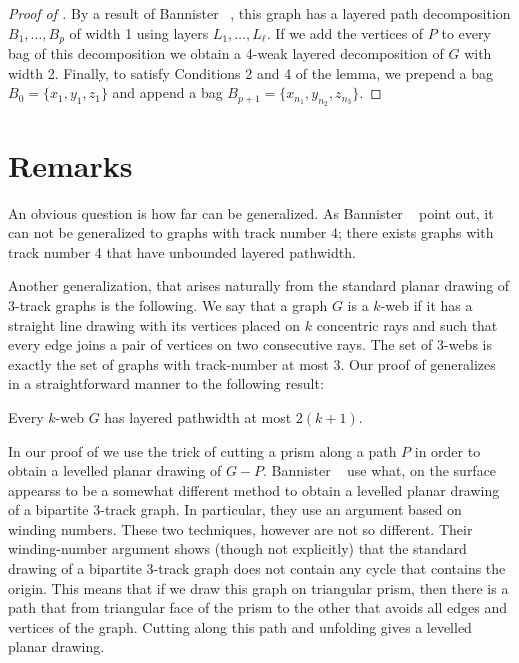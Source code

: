 \documentclass{patmorin}
\begin{document}
\begin{proof}[Proof of ]
  By a result of Bannister \etal\ \cite[Proof of
  Theorem~5]{bannister.devanny.ea:track}, this graph has a
  layered path decomposition $B_1,\ldots,B_p$ of width 1 using layers
  $L_1,\ldots,L_\ell$.  If we add the vertices of $P$ to every bag
  of this decomposition we obtain a 4-weak layered decomposition of
  $G$ with width 2.  Finally, to satisfy Conditions 2 and 4 of the
  lemma, we prepend a bag $B_0=\{x_1,y_1,z_1\}$ and append a bag
  $B_{p+1}=\{x_{n_1},y_{n_2},z_{n_3}\}$.
\end{proof}

\section{Remarks}

An obvious question is how far  can be generalized. As
Bannister \etal\ \cite{bannister.devanny.ea:track} point out, it can not be generalized to graphs with
track number 4; there exists graphs with track number 4 that have 
unbounded layered pathwidth.

Another generalization, that arises naturally from the standard planar
drawing of 3-track graphs is the following. We say that a graph $G$
is a $k$-web if it has a straight line drawing with its vertices placed
on $k$ concentric rays and such that every edge joins a pair of vertices
on two consecutive rays.  The set of 3-webs is exactly the set of graphs
with track-number at most 3.  Our proof of  generalizes in a straightforward manner to the following result:

\begin{thm}
   Every $k$-web $G$ has layered pathwidth at most $2(k+1)$.
\end{thm}

In our proof of  we use the trick of cutting a prism
along a path $P$ in order to obtain a levelled planar drawing of $G-P$.
Bannister \etal\ \cite{bannister.devanny.ea:track} use what, on the surface
appearss to be a somewhat different method to obtain a levelled planar
drawing of a bipartite 3-track graph.  In particular, they use an argument
based on winding numbers.  These two techniques, however are not so
different. Their winding-number argument shows (though not explicitly)
that the standard drawing of a  bipartite 3-track graph does not contain
any cycle that contains the origin.  This means that if we draw this graph
on triangular prism, then there is a path that from triangular face of
the prism to the other that avoids all edges and vertices of the graph.
Cutting along this path and unfolding gives a levelled planar drawing.




\end{document}
